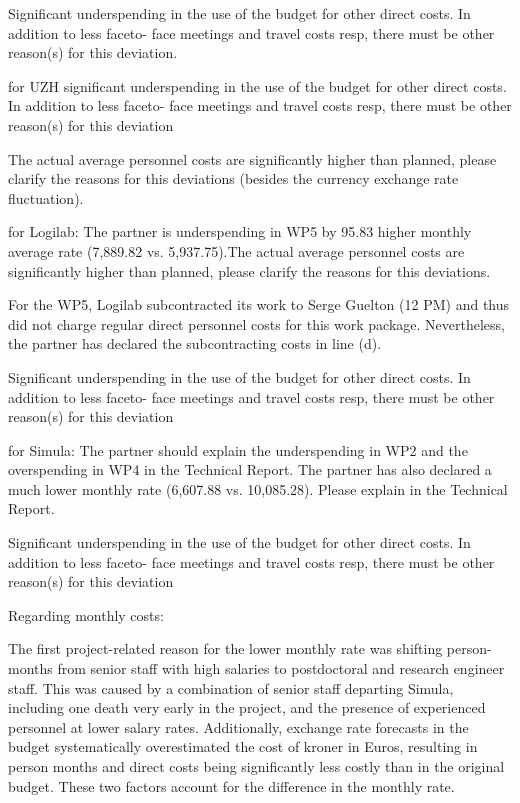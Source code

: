 Significant underspending in the use of the budget for other direct costs. In addition to less faceto-
face meetings and travel costs resp, there must be other reason(s) for this deviation.

for UZH
significant underspending in the use of the budget for other direct costs. In addition to less faceto-
face meetings and travel costs resp, there must be other reason(s) for this deviation

The actual average personnel costs are significantly higher than planned, 
please clarify the reasons for this deviations (besides the currency exchange rate fluctuation).

for Logilab:
The partner is underspending in WP5 by 95.83%
higher monthly average rate (7,889.82 vs. 5,937.75).The actual average personnel costs are significantly higher than planned, 
please clarify the reasons for this deviations.

For the WP5, Logilab subcontracted its work to Serge Guelton (12 PM) and thus  did not charge regular direct personnel costs for this work package. Nevertheless, the partner has declared the subcontracting costs in line (d).

Significant underspending in the use of the budget for other direct costs. In addition to less faceto-
face meetings and travel costs resp, there must be other reason(s) for this deviation


for Simula:
The partner should explain the underspending in WP2 and the overspending in WP4 in the
Technical Report. The partner has also declared a much lower monthly rate (6,607.88 vs. 10,085.28). Please explain in the Technical Report.

Significant underspending in the use of the budget for other direct costs. In addition to less faceto-
face meetings and travel costs resp, there must be other reason(s) for this deviation

Regarding monthly costs:

The first project-related reason for the lower monthly rate was shifting person-months from senior staff with high salaries
to postdoctoral and research engineer staff.
This was caused by a combination of senior staff departing Simula, including one death very early in the project,
and the presence of experienced personnel at lower salary rates.
Additionally, exchange rate forecasts in the budget systematically overestimated the cost of kroner in Euros,
resulting in person months and direct costs being significantly less costly than in the original budget.
These two factors account for the difference in the monthly rate.

